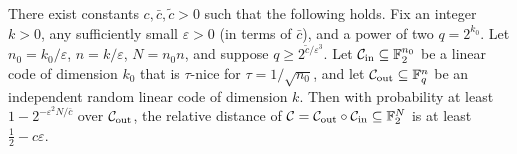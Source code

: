 \begin{theorem}
  \label{thm:most-codes}
  There exist constants $c, \bar{c}, \tilde{c} > 0$ such that the following
  holds. Fix an integer $k > 0$, any sufficiently small $\varepsilon > 0$ (in
  terms of $\bar c$), and a power of two $q = 2^{k_0}$. Let $n_0 = k_0/\varepsilon$,
  $n = k/\varepsilon$, $N = n_0 n$, and suppose $q \geq 2^{\tilde c/\varepsilon^3}$.
  Let $\mathcal{C}_{\mathrm{in}} \subseteq \mathbb{F}_2^{n_0}$ be a linear code of dimension $k_0$ that is
  $\tau$-nice for $\tau = 1/\sqrt{n_0}$, and let $\mathcal{C}_{\mathrm{out}} \subseteq \mathbb{F}_q^n$ be an
  independent random linear code of dimension $k$. Then with probability at least
  $1 - 2^{-\varepsilon^2 N/\bar c}$ over $\mathcal{C}_{\mathrm{out}}$, the relative distance of
  $\mathcal{C} = \mathcal{C}_{\mathrm{out}} \circ \mathcal{C}_{\mathrm{in}} \subseteq \mathbb{F}_2^N$ is at least
  $\frac12 - c\varepsilon$.
\end{theorem}
